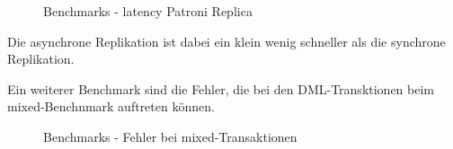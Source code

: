 \begin{flushleft}
\begin{figure}[H]
        \qquad
        \caption{Benchmarks - latency Patroni Replica}
        \label{fig:latency_patroni_replica}
    \end{figure}
    Die asynchrone Replikation ist dabei ein klein wenig schneller als die synchrone Replikation.
\end{flushleft}
\clearpage
\begin{flushleft}
    Ein weiterer Benchmark sind die Fehler, die bei den DML-Transktionen beim mixed-Benchnmark auftreten können.
    \begin{figure}[H]
        \centering
        \qquad
        \caption{Benchmarks - Fehler bei mixed-Transaktionen}
        \label{fig:pgbench_errors}
    \end{figure}
\end{flushleft}
